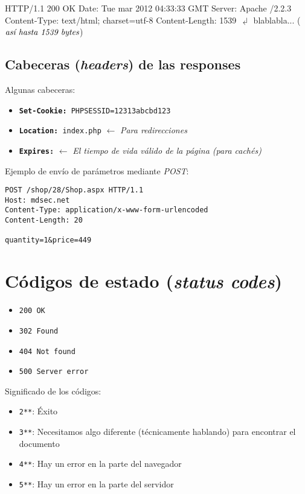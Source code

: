 \documentclass[a4paper,11pt]{memoir}
\begin{document}
\begin{codigo}
HTTP/1.1 200 OK
Date: Tue mar 2012 04:33:33 GMT
Server: Apache /2.2.3
Content-Type: text/html; charset=utf-8
Content-Length: 1539
\(\dlsh\)
blablabla...                (\(\emph{así hasta 1539 bytes}\))
\end{codigo}

\subsection{Cabeceras (\emph{headers}) de las responses}

Algunas cabeceras:

\begin{itemize}
    \item \texttt{\textbf{Set-Cookie:} PHPSESSID=12313abcbd123}
    \item \texttt{\textbf{Location:} index.php} \(\leftarrow\) \emph{Para
        redirecciones}
    \item \texttt{\textbf{Expires:}} \(\leftarrow\) \emph{El tiempo de
        vida válido de la página (para cachés)}
\end{itemize}

Ejemplo de envío de parámetros mediante \emph{POST}:

\begin{verbatim}
POST /shop/28/Shop.aspx HTTP/1.1
Host: mdsec.net
Content-Type: application/x-www-form-urlencoded
Content-Length: 20

quantity=1&price=449
\end{verbatim}

\section{Códigos de estado (\emph{status codes})}

\begin{itemize}
    \item \texttt{200 OK}
    \item \texttt{302 Found}
    \item \texttt{404 Not found}
    \item \texttt{500 Server error}
\end{itemize}

Significado de los códigos:

\begin{itemize}
    \item \texttt{2**}: Éxito
    \item \texttt{3**}: Necesitamos algo diferente (técnicamente hablando)
    para encontrar el documento
    \item \texttt{4**}: Hay un error en la parte del navegador
    \item \texttt{5**}: Hay un error en la parte del servidor
\end{itemize}
\end{document}

